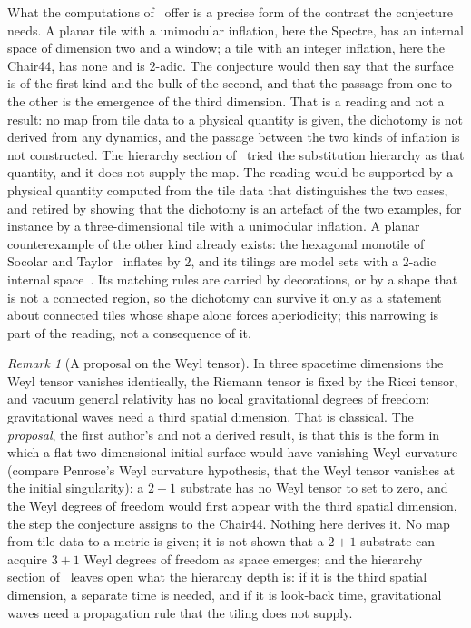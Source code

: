 \documentclass[11pt]{article}
\theoremstyle{definition}
\theoremstyle{remark}
\newtheorem{remark}{Remark}
\begin{document}
What the computations of~\cite{HartshornRomanov} offer is a precise form of the contrast the conjecture needs.  A planar tile with a unimodular
inflation, here the Spectre, has an internal space of dimension two and a window; a tile with an integer inflation, here the
Chair44, has none and is $2$-adic.  The conjecture would then say that the surface is of the first kind and the bulk of the
second, and that the passage from one to the other is the emergence of the third dimension.  That is a reading and not a
result: no map from tile data to a physical quantity is given, the dichotomy is not derived from any dynamics, and the
passage between the two kinds of inflation is not constructed.  The hierarchy section of~\cite{HartshornRomanov} tried the substitution hierarchy as that quantity, and it does not
supply the map.  The reading would
be supported by a physical quantity computed from the tile data that distinguishes the two cases, and retired by showing
that the dichotomy is an artefact of the two examples, for instance by a three-dimensional tile with a unimodular
inflation.  A planar counterexample of the other kind already exists: the hexagonal monotile of Socolar and
Taylor~\cite{SocolarTaylor} inflates by $2$, and its tilings are model sets with a $2$-adic internal
space~\cite{LeeMoodyTS}.  Its matching rules are carried by decorations, or by a shape that is not a connected region, so
the dichotomy can survive it only as a statement about connected tiles whose shape alone forces aperiodicity; this
narrowing is part of the reading, not a consequence of it.

\begin{remark}[A proposal on the Weyl tensor]
\label{rem:weyl}
In three spacetime dimensions the Weyl tensor vanishes identically, the Riemann tensor is fixed by the Ricci tensor, and
vacuum general relativity has no local gravitational degrees of freedom: gravitational waves need a third spatial
dimension.  That is classical.  The \emph{proposal}, the first author's and not a derived result, is that this is the form in which
a flat two-dimensional initial surface would have vanishing Weyl curvature (compare Penrose's Weyl curvature hypothesis, that
the Weyl tensor vanishes at the initial singularity): a $2{+}1$ substrate has no Weyl tensor to set to zero, and the Weyl
degrees of freedom would first appear with the third spatial dimension, the step the conjecture assigns to the Chair44.
Nothing here derives it.  No map from tile data to a metric is given; it is not shown that a $2{+}1$ substrate can acquire
$3{+}1$ Weyl degrees of freedom as space emerges; and the hierarchy section of~\cite{HartshornRomanov} leaves open what
the hierarchy depth is: if it is the
third spatial dimension, a separate time is needed, and if it is look-back time, gravitational waves need a propagation rule that
the tiling does not supply.
\end{remark}
\end{document}
